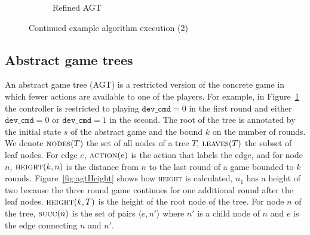 \begin{figure}
\begin{subfigure}[t]{0.3\textwidth}
\begin{minipage}[t][3.9cm][t]{\textwidth}
        \end{minipage}
        \caption{Refined AGT}
        \label{fig:example1i}
    \end{subfigure}%
    \caption{Continued example algorithm execution (2)}
    \label{fig:example1execont2}
\end{figure}


\subsection{Abstract game trees}

An abstract game tree (AGT) is a restricted version of the concrete game in which fewer actions are available to one of the players. For example, in Figure~\ref{fig:example1i} the controller is restricted to playing $\texttt{dev\_cmd} = 0$ in the first round and either $\texttt{dev\_cmd} = 0$ or $\texttt{dev\_cmd} = 1$ in the second.  The root of the tree is annotated by the initial state $s$ of the abstract game and the bound $k$ on the number of rounds.  We denote $\textsc{nodes}(T)$ the set of all nodes of a tree $T$, $\textsc{leaves}(T)$ the subset of leaf nodes.  For edge $e$, $\textsc{action}(e)$ is the action that labels the edge, and for node $n$, $\textsc{height}(k, n)$ is the distance from $n$ to the last round of a game bounded to $k$ rounds. Figure~\ref{fig:agtHeight} shows how \textsc{height} is calculated, $n_1$ has a height of two because the three round game continues for one additional round after the leaf nodes.  $\textsc{height}(k, T)$ is the height of the root node of the tree.  For node $n$ of the tree, $\textsc{succ}(n)$ is the set of pairs $\langle e, n' \rangle$ where $n'$ is a child node of $n$ and $e$ is the edge connecting $n$ and $n'$.

